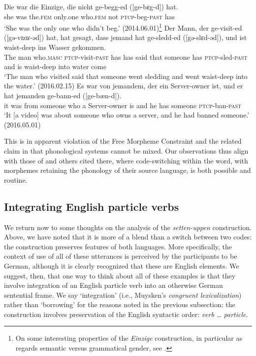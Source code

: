 \documentclass[output=paper]{langscibook}
\begin{document}
\ea\gll Die war die Einzige, die nicht {ge-begg-ed ({[}ge-bɛg-d{]})} hat.\\
she was the.\textsc{fem} only.one who.\textsc{fem} not \textsc{ptcp}-beg-\textsc{past} has\\
\glt `She was the only one who didn't beg.' (2014.06.01)\footnote{On some interesting properties of the \textit{Einzige} construction, in particular as regards semantic versus grammatical gender, see \cite{wurmbrand17a}.}
\z 
\ea\gll \label{gevisited}Der Mann, der {ge-visit-ed ({[}gə-vɪzɪɾ-əd{]})} hat, hat gesagt, dass jemand hat {ge-sledd-ed  ({[}gə-slɛd-əd{]})}, und ist waist-deep ins Wasser gekommen. \\
The man who.\textsc{masc} \textsc{ptcp}-visit-\textsc{past} has has said that someone has \textsc{ptcp}-sled-\textsc{past} and is waist-deep into water come\\
\glt `The man who visited said that someone went sledding and went waist-deep into the water.' (2016.02.15)
\z 
\ea\gll Es war von jemandem, der ein Server-owner ist, und er hat jemanden ge-bann-ed ({[}ge-b{\ae}n-d{]}).\\
it was from someone who a Server-owner is and he has someone \textsc{ptcp-}ban-\textsc{past}\\
\glt `It [a video] was about someone who owns a server, and he had banned someone.' (2016.05.01)
\z

This is in apparent violation of the Free Morpheme Constraint \citep{poplack80} and the related claim in \citet[45]{macswan99} that phonological systems cannot be mixed. Our observations thus align with those of \citet[159-160]{myersscotton02} and others cited there, where code-switching within the word, with morphemes retaining the phonology of their source language, is both possible and routine.

\subsection{Integrating English particle verbs}

We return now to some thoughts on the analysis of the \textit{setten-uppen} construction. Above, we have noted that it is more of a blend than a switch between two codes: the construction preserves features of both languages. More specifically, the context of use of all of these utterances is perceived by the participants to be German, although it is clearly recognized that these are English elements. We suggest, then, that one way to think about all of these examples is that they involve integration of an English particle verb into an otherwise German sentential frame. We say `integration' (i.e., Muysken's \textit{congruent lexicalization}) rather than `borrowing' for the reasons noted in the previous subsection: the construction involves preservation of the English syntactic order: \textit{verb {\ldots} particle}. 
\end{document}
